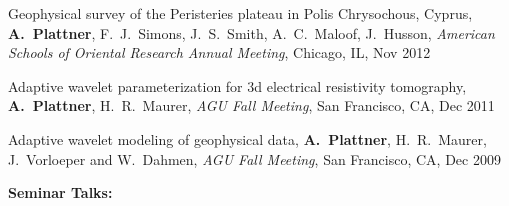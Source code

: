 \documentclass[10pt]{article}
\begin{document}
\spcp
Geophysical survey of the Peristeries plateau in Polis Chrysochous, Cyprus,
\textbf{A.~Plattner}, F.~J.~Simons, J.~S.~Smith, A.~C.~Maloof, J.~Husson,
\emph{American Schools of Oriental Research Annual Meeting}, Chicago, IL, Nov 2012

\spcp
Adaptive wavelet parameterization for 3d electrical resistivity tomography,
\textbf{A.~Plattner}, H.~R.~Maurer, 
\emph{AGU Fall Meeting}, San Francisco, CA, Dec 2011

\spcp
Adaptive wavelet modeling of geophysical data,
\textbf{A.~Plattner}, H.~R.~Maurer, J.~Vorloeper and W.~Dahmen, 
\emph{AGU Fall Meeting}, San Francisco, CA, Dec 2009



\clearpage

\textbf{\tsize Seminar Talks:}
\end{document}
